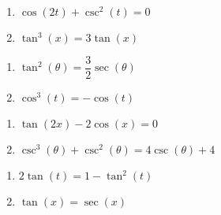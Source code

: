 \documentclass{ximera}
\begin{document}
\begin{multicols}{2}

\begin{enumerate}

\setcounter{enumi}{\value{HW}}

\item  $\cos(2t) + \csc^{2}(t) = 0$
\item $\tan^{3} \left( x \right) = 3\tan \left( x \right)$

\setcounter{HW}{\value{enumi}}

\end{enumerate}

\end{multicols}

\begin{multicols}{2}

\begin{enumerate}

\setcounter{enumi}{\value{HW}}

\item $\tan^{2} \left( \theta \right) = \dfrac{3}{2} \sec \left( \theta \right)$
\item $\cos^{3} \left( t \right) = -\cos \left( t \right)$ 

\setcounter{HW}{\value{enumi}}

\end{enumerate}

\end{multicols}

\begin{multicols}{2}

\begin{enumerate}

\setcounter{enumi}{\value{HW}}

\item $\tan (2x) - 2\cos(x) = 0$
\item $\csc^{3}(\theta) + \csc^{2}(\theta) = 4\csc(\theta) + 4$

\setcounter{HW}{\value{enumi}}

\end{enumerate}

\end{multicols}

\enlargethispage{0.35in}
\vspace{-0.15in}

\begin{multicols}{2}

\begin{enumerate}

\setcounter{enumi}{\value{HW}}

\item $2\tan(t) = 1 - \tan^{2}(t)$
\item $\tan \left( x \right) = \sec \left( x \right)$ \label{solveidentlast}

\setcounter{HW}{\value{enumi}}

\end{enumerate}

\end{multicols}
\end{document}
